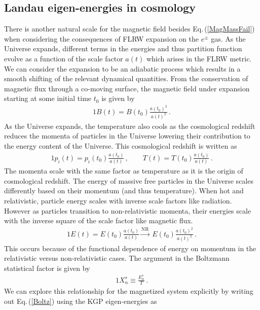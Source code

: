 \documentclass[universe,article,submit,moreauthors,pdftex,a4paper]{Definitions/mdpi}
\newcommand{\req}[1]{Eq.\,(\ref{#1})}
\begin{document}
\subsection{Landau eigen-energies in cosmology}\label{sec:Landau}
\noindent There is another natural scale for the magnetic field besides \req{MagMassFail} when considering the consequences of FLRW expansion on the $e^{\pm}$ gas. As the Universe expands, different terms in the energies and thus partition function evolve as a function of the scale factor $a(t)$ which arises in the FLRW metric. We can consider the expansion to be an adiabatic process which results in a smooth shifting of the relevant dynamical quantities. From the conservation of magnetic flux through a co-moving surface, the magnetic field under expansion starting at some initial time $t_{0}$ is given by
\begin{alignat}{1}
 \label{BScale} B(t) = B(t_{0})\frac{a(t_{0})^{2}}{a(t)^{2}}\,.
\end{alignat}
As the Universe expands, the temperature also cools as the cosmological redshift reduces the momenta of particles in the Universe lowering their contribution to the energy content of the Universe. This cosmological redshift is written as
\begin{alignat}{1}
 \label{Redshift} p_{i}(t) = p_{i}(t_{0})\frac{a(t_{0})}{a(t)}\,,\qquad T(t) = T(t_{0})\frac{a(t_{0})}{a(t)}\,.
\end{alignat}
The momenta scale with the same factor as temperature as it is the origin of cosmological redshift. The energy of massive free particles in the Universe scales differently based on their momentum (and thus temperature). When hot and relativistic, particle energy scales with inverse scale factors like radiation. However as particles transition to non-relativistic momenta, their energies scale with the inverse square of the scale factor like magnetic flux.
\begin{alignat}{1}
 \label{EScale} E(t) = E(t_{0})\frac{a(t_{0})}{a(t)}\xrightarrow{\mathrm{NR}}\ E(t_{0})\frac{a(t_{0})^{2}}{a(t)^{2}}\,.
\end{alignat}
This occurs because of the functional dependence of energy on momentum in the relativistic versus non-relativistic cases. The argument in the Boltzmann statistical factor is given by
\begin{alignat}{1}
 \label{Boltz} X_{n}^{s}\equiv\frac{E_{n}^{s}}{T}\,.
\end{alignat}
We can explore this relationship for the magnetized system explicitly by writing out \req{Boltz} using the KGP eigen-energies as
\end{document}

